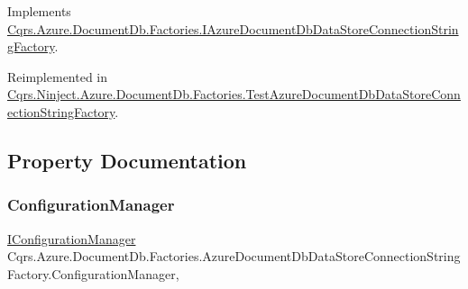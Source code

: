 Implements \hyperlink{interfaceCqrs_1_1Azure_1_1DocumentDb_1_1Factories_1_1IAzureDocumentDbDataStoreConnectionStringFactory_afdb9a4c6d4ada68c58413909d65e3d1c_afdb9a4c6d4ada68c58413909d65e3d1c}{Cqrs.\+Azure.\+Document\+Db.\+Factories.\+I\+Azure\+Document\+Db\+Data\+Store\+Connection\+String\+Factory}.



Reimplemented in \hyperlink{classCqrs_1_1Ninject_1_1Azure_1_1DocumentDb_1_1Factories_1_1TestAzureDocumentDbDataStoreConnectionStringFactory_a3f802b2e647584bb96fdcdb532a149bb_a3f802b2e647584bb96fdcdb532a149bb}{Cqrs.\+Ninject.\+Azure.\+Document\+Db.\+Factories.\+Test\+Azure\+Document\+Db\+Data\+Store\+Connection\+String\+Factory}.



\subsection{Property Documentation}
\mbox{\label{classCqrs_1_1Azure_1_1DocumentDb_1_1Factories_1_1AzureDocumentDbDataStoreConnectionStringFactory_a7d0a40bb03e9e15306023bf97094cf60_a7d0a40bb03e9e15306023bf97094cf60}} 
\subsubsection{\texorpdfstring{Configuration\+Manager}{ConfigurationManager}}
{\footnotesize\ttfamily \hyperlink{interfaceCqrs_1_1Configuration_1_1IConfigurationManager}{I\+Configuration\+Manager} Cqrs.\+Azure.\+Document\+Db.\+Factories.\+Azure\+Document\+Db\+Data\+Store\+Connection\+String\+Factory.\+Configuration\+Manager\hspace{0.3cm}{\ttfamily [get]}, {\ttfamily [protected]}}


